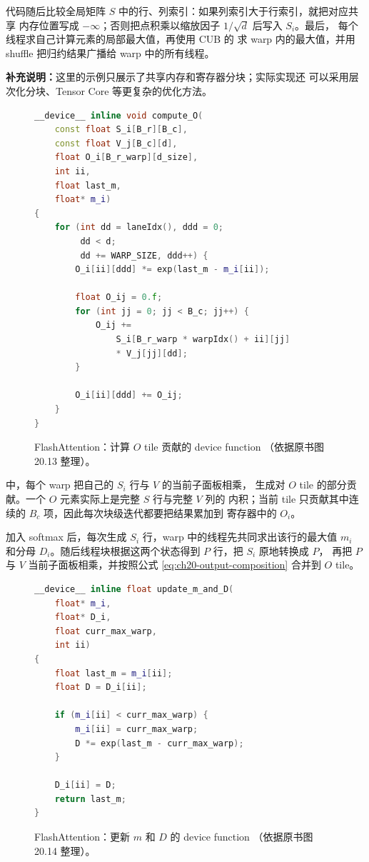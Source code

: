 代码随后比较全局矩阵 $S$ 中的行、列索引：如果列索引大于行索引，就把对应共享
内存位置写成 $-\infty$；否则把点积乘以缩放因子 $1/\sqrt d$ 后写入 $S_i$。最后，
每个线程求自己计算元素的局部最大值，再使用 CUB 的  求 warp
内的最大值，并用 shuffle 把归约结果广播给 warp 中的所有线程。

\noindent\textbf{补充说明：}这里的示例只展示了共享内存和寄存器分块；实际实现还
可以采用层次化分块、Tensor Core 等更复杂的优化方法。

\begin{figure}[htbp]
  \centering
  \begin{lstlisting}[language=C++,basicstyle=\ttfamily\scriptsize]
__device__ inline void compute_O(
    const float S_i[B_r][B_c],
    const float V_j[B_c][d],
    float O_i[B_r_warp][d_size],
    int ii,
    float last_m,
    float* m_i)
{
    for (int dd = laneIdx(), ddd = 0;
         dd < d;
         dd += WARP_SIZE, ddd++) {
        O_i[ii][ddd] *= exp(last_m - m_i[ii]);

        float O_ij = 0.f;
        for (int jj = 0; jj < B_c; jj++) {
            O_ij +=
                S_i[B_r_warp * warpIdx() + ii][jj]
                * V_j[jj][dd];
        }

        O_i[ii][ddd] += O_ij;
    }
}
  \end{lstlisting}
  \caption{FlashAttention：计算 $O$ tile 贡献的 device function
  （依据原书图 20.13 整理）。}
  \label{fig:20-13}
\end{figure}

 中，每个 warp 把自己的 $S_i$ 行与 $V$ 的当前子面板相乘，
生成对 $O$ tile 的部分贡献。一个 $O$ 元素实际上是完整 $S$ 行与完整 $V$ 列的
内积；当前 tile 只贡献其中连续的 $B_c$ 项，因此每次块级迭代都要把结果累加到
寄存器中的 $O_i$。

加入 softmax 后，每次生成 $S_i$ 行，warp 中的线程先共同求出该行的最大值 $m_i$
和分母 $D_i$。随后线程块根据这两个状态得到 $P$ 行，把 $S_i$ 原地转换成 $P$，
再把 $P$ 与 $V$ 当前子面板相乘，并按照公式 \eqref{eq:ch20-output-composition}
合并到 $O$ tile。

\begin{figure}[htbp]
  \centering
  \begin{lstlisting}[language=C++,basicstyle=\ttfamily\scriptsize]
__device__ inline float update_m_and_D(
    float* m_i,
    float* D_i,
    float curr_max_warp,
    int ii)
{
    float last_m = m_i[ii];
    float D = D_i[ii];

    if (m_i[ii] < curr_max_warp) {
        m_i[ii] = curr_max_warp;
        D *= exp(last_m - curr_max_warp);
    }

    D_i[ii] = D;
    return last_m;
}
  \end{lstlisting}
  \caption{FlashAttention：更新 $m$ 和 $D$ 的 device function
  （依据原书图 20.14 整理）。}
  \label{fig:20-14}
\end{figure}

